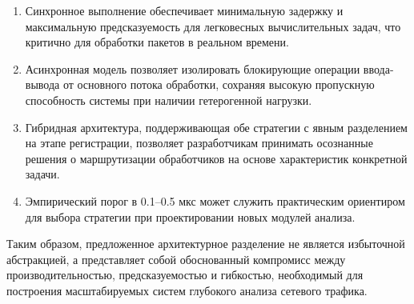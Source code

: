 \begin{enumerate}
    \item Синхронное выполнение обеспечивает минимальную задержку и максимальную предсказуемость для легковесных вычислительных задач, что критично для обработки пакетов в реальном времени.

    \item Асинхронная модель позволяет изолировать блокирующие операции ввода-вывода от основного потока обработки, сохраняя высокую пропускную способность системы при наличии гетерогенной нагрузки.

    \item Гибридная архитектура, поддерживающая обе стратегии с явным разделением на этапе регистрации, позволяет разработчикам принимать осознанные решения о маршрутизации обработчиков на основе характеристик конкретной задачи.

    \item Эмпирический порог в 0.1--0.5 мкс может служить практическим ориентиром для выбора стратегии при проектировании новых модулей анализа.
\end{enumerate}

Таким образом, предложенное архитектурное разделение не является избыточной абстракцией, а представляет собой обоснованный компромисс между производительностью, предсказуемостью и гибкостью, необходимый для построения масштабируемых систем глубокого анализа сетевого трафика.




\newpage

